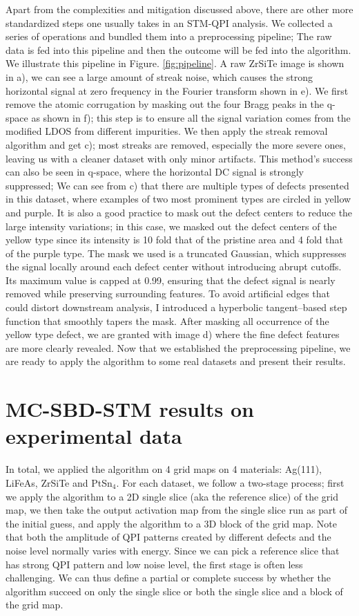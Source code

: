 Apart from the complexities and mitigation discussed above, there are other more standardized steps one usually takes in an STM-QPI analysis. We collected a series of operations and bundled them into a preprocessing pipeline; The raw data is fed into this pipeline and then the outcome will be fed into the algorithm. We illustrate this pipeline in Figure. \ref{fig:pipeline}. A raw ZrSiTe image is shown in a), we can see a large amount of streak noise, which causes the strong horizontal signal at zero frequency in the Fourier transform shown in e). We first remove the atomic corrugation by masking out the four Bragg peaks in the q-space as shown in f); this step is to ensure all the signal variation comes from the modified \ac{LDOS} from different impurities. We then apply the streak removal algorithm and get c); most streaks are removed, especially the more severe ones, leaving us with a cleaner dataset with only minor artifacts. This method's success can also be seen in q-space, where the horizontal DC signal is strongly suppressed; We can see from c) that there are multiple types of defects presented in this dataset, where examples of two most prominent types are circled in yellow and purple. It is also a good practice to mask out the defect centers to reduce the large intensity variations; in this case, we masked out the defect centers of the yellow type since its intensity is 10 fold that of the pristine area and 4 fold that of the purple type. The mask we used is a truncated Gaussian, which suppresses the signal locally around each defect center without introducing abrupt cutoffs. Its maximum value is capped at 0.99, ensuring that the defect signal is nearly removed while preserving surrounding features. To avoid artificial edges that could distort downstream analysis, I introduced a hyperbolic tangent–based step function that smoothly tapers the mask. After masking all occurrence of the yellow type defect, we are granted with image d) where the fine defect features are more clearly revealed. Now that we established the preprocessing pipeline, we are ready to apply the algorithm to some real datasets and present their results. 

\section{MC-SBD-STM results on experimental data}
In total, we applied the algorithm on 4 grid maps on 4 materials: Ag(111), LiFeAs, ZrSiTe and PtSn$_4$. For each dataset, we follow a two-stage process; first we apply the algorithm to a 2D single slice (aka the reference slice) of the grid map, we then take the output activation map from the single slice run as part of the initial guess, and apply the algorithm to a 3D block of the grid map. Note that both the amplitude of QPI patterns created by different defects and the noise level normally varies with energy. Since we can pick a reference slice that has strong QPI pattern and low noise level, the first stage is often less challenging. We can thus define a partial or complete success by whether the algorithm succeed on only the single slice or both the single slice and a block of the grid map. 

